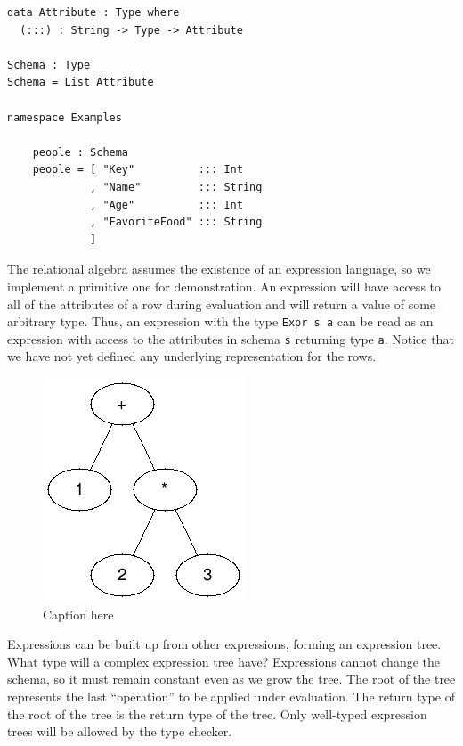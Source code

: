 \documentclass[12pt]{article}
\begin{document}
\begin{lstlisting}
data Attribute : Type where
  (:::) : String -> Type -> Attribute

Schema : Type
Schema = List Attribute

namespace Examples

    people : Schema
    people = [ "Key"          ::: Int 
             , "Name"         ::: String
             , "Age"          ::: Int
             , "FavoriteFood" ::: String
             ]
\end{lstlisting}

The relational algebra assumes the existence of an expression language, so we implement a primitive one for demonstration.
An expression will have access to all of the attributes of a row during evaluation and will return a value of some arbitrary type.
Thus, an expression with the type \texttt{Expr s a} can be read as an expression with access to the attributes in schema \texttt{s} returning type \texttt{a}.
Notice that we have not yet defined any underlying representation for the rows.

\begin{figure}[tb]
    \centering
    \includegraphics[]{assets/expr_tree.png}
    \caption{Caption here}
    \label{fig:figure1}
\end{figure}

Expressions can be built up from other expressions, forming an expression tree.
What type will a complex expression tree have?
Expressions cannot change the schema, so it must remain constant even as we grow the tree.
The root of the tree represents the last ``operation'' to be applied under evaluation.
The return type of the root of the tree is the return type of the tree.
Only well-typed expression trees will be allowed by the type checker.
\end{document}
